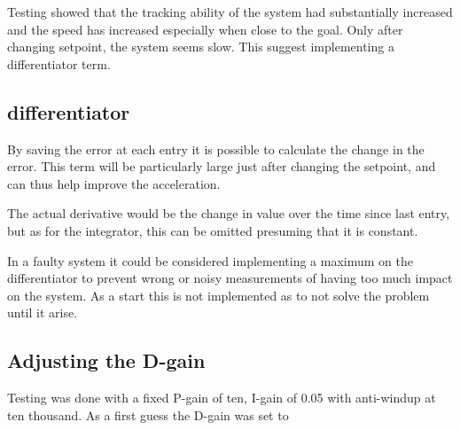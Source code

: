 Testing showed that the tracking ability of the system had substantially increased and the speed has increased especially when close to the goal. Only after changing setpoint, the system seems slow. This suggest implementing a differentiator term.

\subsection{differentiator}
By saving the error at each entry it is possible to calculate the change in the error. This term will be particularly large just after changing the setpoint, and can thus help improve the acceleration.

The actual derivative would be the change in value over the time since last entry, but as for the integrator, this can be omitted presuming that it is constant.

In a faulty system it could be considered implementing a maximum on the differentiator to prevent wrong or noisy measurements of having too much impact on the system. As a start this is not implemented as to not solve the problem until it arise.

\subsection{Adjusting the D-gain}
Testing was done with a fixed P-gain of ten, I-gain of 0.05 with anti-windup at ten thousand. As a first guess the D-gain was set to
